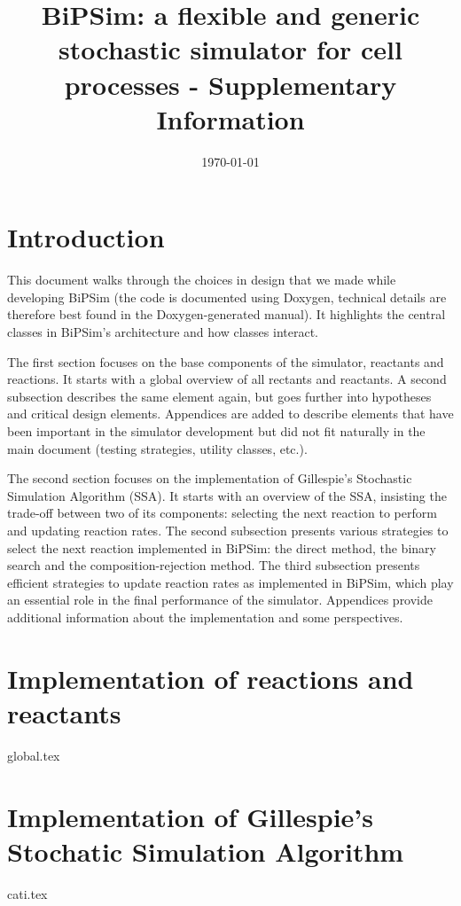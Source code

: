 \documentclass[12pt]{scrartcl}
\theoremstyle{definition}
\theoremstyle{remark}
\numberwithin{equation}{section}
\begin{document}
\title{BiPSim: a flexible and generic stochastic simulator for cell processes - Supplementary Information}%
\author{}%
\date{\today}%
\maketitle

\newpage

\tableofcontents

\newpage

\section{Introduction}

This document walks through the choices in design that we made while developing BiPSim
(the code is documented using Doxygen, technical details are therefore best found in the Doxygen-generated manual).
It highlights the central classes in BiPSim's architecture and how classes interact.

The first section focuses on the base components of the simulator, reactants and reactions.
It starts with a global overview of all rectants and reactants.
A second subsection describes the same element again,
but goes further into hypotheses and critical design elements.
Appendices are added to describe elements that have been important in the simulator development
but did not fit naturally in the main document (testing strategies, utility classes, etc.).

The second section focuses on the implementation of Gillespie's Stochastic Simulation Algorithm (SSA).
It starts with an overview of the SSA, insisting the trade-off between two of its
components: selecting the next reaction to perform and updating reaction rates.
The second subsection presents various strategies to select the next reaction implemented in BiPSim:
the direct method, the binary search and the composition-rejection method.
The third subsection presents efficient strategies to update reaction rates as implemented
in BiPSim, which play an essential role in the final performance of the simulator.
Appendices provide additional information about the implementation and some perspectives.

\section{Implementation of reactions and reactants}

{global.tex}
\clearpage

\clearpage

\section{Implementation of Gillespie's Stochatic Simulation Algorithm}

{cati.tex}
\clearpage



\end{document}
